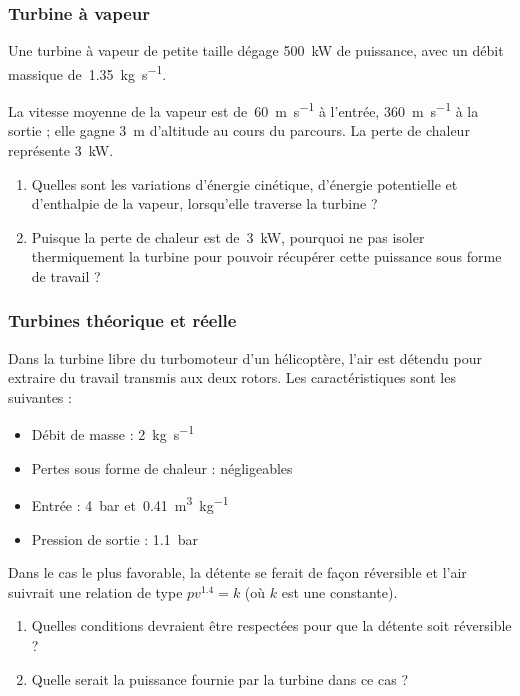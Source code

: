 	
\subsubsection{Turbine à vapeur}
\label{exo_turbine_vapeur_2}

	Une turbine à vapeur de petite taille dégage \SI{500}{\kilo\watt} de puissance, avec un débit massique de~\SI{1,35}{\kilogram\per\second}.
	
	La vitesse moyenne de la vapeur est de~\SI{60}{\metre\per\second} à l’entrée, \SI{360}{\metre\per\second} à la sortie ; elle gagne \SI{3}{\metre} d’altitude au cours du parcours. La perte de chaleur représente \SI{3}{\kilo\watt}.
	
	
	\begin{enumerate}
		\item Quelles sont les variations d’énergie cinétique, d’énergie potentielle et d’enthalpie de la vapeur, lorsqu’elle traverse la turbine ?
		\item Puisque la perte de chaleur est de~\SI{3}{\kilo\watt}, pourquoi ne pas isoler thermiquement la turbine pour pouvoir récupérer cette puissance sous forme de travail ?
	\end{enumerate}
	

	
\subsubsection{Turbines théorique et réelle}
\label{exo_detente_turbine_turbomoteur}

	Dans la turbine libre du turbomoteur d’un hélicoptère, l’air est détendu pour extraire du travail transmis aux deux rotors. Les caractéristiques sont les suivantes :
	
	\begin{itemize}
		\item Débit de masse : 		\tab \SI{2}{\kilogram\per\second}
		\item Pertes sous forme de chaleur : négligeables
		\item Entrée :  				\tab \SI{4}{\bar} et~\SI{0,41}{\metre\cubed\per\kilogram}
		\item Pression de sortie : \tab \SI{1,1}{\bar}
	\end{itemize}
	
	Dans le cas le plus favorable, la détente se ferait de façon réversible et l’air suivrait une relation de type $p v^{\num{1,4}} = k$ (où $k$ est une constante).
	
	\begin{enumerate}
		\item Quelles conditions devraient être respectées pour que la détente soit réversible ?
		\item Quelle serait la puissance fournie par la turbine dans ce cas ?
	\end{enumerate}
	
